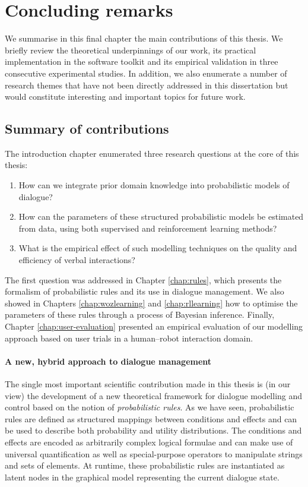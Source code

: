 \chapter{Concluding remarks}
\label{chap:conclusions}

We summarise in this final chapter the main contributions of this thesis.  We briefly review the theoretical underpinnings of our work, its practical implementation in the \opendial{} software toolkit and its empirical validation in three consecutive experimental studies.  In addition, we also enumerate a number of research themes that have not been directly addressed in this dissertation but would constitute interesting and important topics for future work. 

\section{Summary of contributions}

The introduction chapter enumerated three research questions at the core of this thesis:
\begin{enumerate}
\item How can we integrate prior domain knowledge into probabilistic models of dialogue?
\item How can the parameters of these structured probabilistic models be estimated from data, using both supervised and reinforcement learning methods?  
\item What is the empirical effect of such modelling techniques on the quality and efficiency of verbal interactions?
\end{enumerate}

The first question was addressed in Chapter \ref{chap:rules}, which presents the formalism of probabilistic rules and its use in dialogue management.  We also showed in Chapters \ref{chap:wozlearning} and \ref{chap:rllearning} how to optimise the parameters of these rules through a process of Bayesian inference.  Finally, Chapter \ref{chap:user-evaluation} presented an empirical evaluation of our modelling approach based on user trials in a human--robot interaction domain.

\subsubsection*{A new, hybrid approach to dialogue management}

The single most important scientific contribution made in this thesis is (in our view) the development of a new theoretical framework for dialogue modelling and control based on the notion of \textit{probabilistic rules}.  As we have seen, probabilistic rules are defined as structured mappings between conditions and effects and can be used to describe both probability and utility distributions.  The conditions and effects are encoded as arbitrarily complex logical formulae and can make use of universal quantification as well as special-purpose operators to manipulate strings and sets of elements. At runtime, these probabilistic rules are instantiated as latent nodes in the graphical model representing the current dialogue state.  

